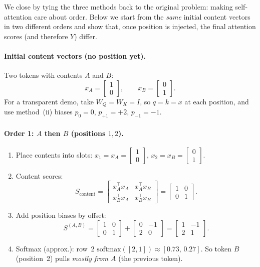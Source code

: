 \documentclass[11pt]{article}
\begin{document}
We close by tying the three methods back to the original problem: making
self-attention care about order. Below we start from the \emph{same}
initial content vectors in two different orders and show that, once
position is injected, the final attention scores (and therefore \(Y\))
differ.

\paragraph{Initial content vectors (no position yet).}
Two tokens with contents \(A\) and \(B\):
\[
  x_A=\begin{bmatrix}1\\0\end{bmatrix},\qquad
  x_B=\begin{bmatrix}0\\1\end{bmatrix}.
\]
For a transparent demo, take \(W_Q=W_K=I\), so
\(q=k=x\) at each position, and use method~(ii) biases
\(p_0=0\), \(p_{+1}=+2\), \(p_{-1}=-1\).

\paragraph{Order 1: \(A\) then \(B\) (positions \(1,2\)).}
\begin{enumerate}[leftmargin=*]
  \item Place contents into slots:
        \(x_1=x_A=\begin{bmatrix}1\\0\end{bmatrix}\),
        \(x_2=x_B=\begin{bmatrix}0\\1\end{bmatrix}\).
  \item Content scores:
        \[
          S_{\text{content}}
          =
          \begin{bmatrix}
            x_A^\top x_A & x_A^\top x_B \\
            x_B^\top x_A & x_B^\top x_B
          \end{bmatrix}
          =
          \begin{bmatrix}1&0\\0&1\end{bmatrix}.
        \]
  \item Add position biases by offset:
        \[
          S^{(A,B)}
          =
          \begin{bmatrix}1&0\\0&1\end{bmatrix}
          +
          \begin{bmatrix}0&-1\\2&0\end{bmatrix}
          =
          \begin{bmatrix}1&-1\\2&1\end{bmatrix}.
        \]
  \item Softmax (approx.): row~2 \(\mathrm{softmax}([2,1])\approx[0.73,\,0.27]\).
        So token \(B\) (position~2) pulls \emph{mostly from \(A\)}
        (the previous token).
\end{enumerate}
\end{document}
